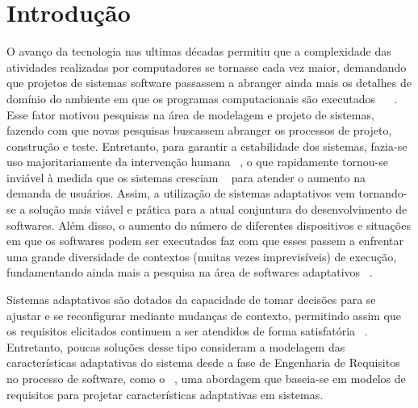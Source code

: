 

\chapter{Introdução}
\label{sec-intro}

O avanço da tecnologia nas ultimas décadas permitiu que a complexidade das atividades realizadas por computadores se tornasse cada vez maior, demandando que projetos de sistemas software passassem a abranger ainda mais os detalhes de domínio do ambiente em que os programas computacionais são executados ~\cite{andersson2009modeling} ~\cite{brun2009engineering}. Esse fator motivou pesquisas na área de modelagem e projeto de sistemas, fazendo com que novas pesquisas buscassem abranger os processos de projeto, construção e teste. Entretanto, para garantir a estabilidade dos sistemas, fazia-se uso majoritariamente da intervenção humana ~\cite{andersson2009modeling}, o que rapidamente tornou-se inviável à medida que os sistemas cresciam ~\cite{andersson2009modeling} para atender o aumento na demanda de usuários. Assim, a utilização de sistemas adaptativos vem tornando-se a solução mais viável e prática para a atual conjuntura do desenvolvimento de softwares. Além disso, o aumento do número de diferentes dispositivos e situações em que os softwares podem ser executados faz com que esses passem a enfrentar uma grande diversidade de contextos (muitas vezes imprevisíveis) de execução, fundamentando ainda mais a pesquisa na área de softwares adaptativos ~\cite{kephart2003vision}.

Sistemas adaptativos são dotados da capacidade de tomar decisões para se ajustar e se reconfigurar mediante mudanças de contexto, permitindo assim que os requisitos elicitados continuem a ser atendidos de forma satisfatória ~\cite{souza2012requirement}. Entretanto, poucas soluções desse tipo consideram a modelagem das características adaptativas do sistema desde a fase de Engenharia de Requisitos no processo de software, como o \zanshin ~\cite{tesevitor}, uma abordagem que baseia-se em modelos de requisitos para projetar características adaptativas em sistemas. 



